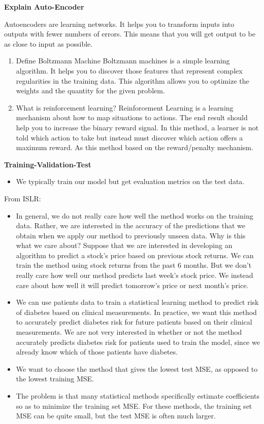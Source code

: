\documentclass[
]{book}
\providecommand{\tightlist}{%
  \setlength{\itemsep}{0pt}\setlength{\parskip}{0pt}}
\begin{document}
\textbf{Explain Auto-Encoder}

Autoencoders are learning networks. It helps you to transform inputs into outputs with fewer numbers of errors. This means that you will get output to be as close to input as possible.

\begin{enumerate}
\def\labelenumi{\arabic{enumi}.}
\setcounter{enumi}{35}
\item
  Define Boltzmann Machine
  Boltzmann machines is a simple learning algorithm. It helps you to discover those features that represent complex regularities in the training data. This algorithm allows you to optimize the weights and the quantity for the given problem.
\item
  What is reinforcement learning?
  Reinforcement Learning is a learning mechanism about how to map situations to actions. The end result should help you to increase the binary reward signal. In this method, a learner is not told which action to take but instead must discover which action offers a maximum reward. As this method based on the reward/penalty mechanism.
\end{enumerate}

\textbf{Training-Validation-Test}

\begin{itemize}
\tightlist
\item
  We typically train our model but get evaluation metrics on the test data.
\end{itemize}

From ISLR:

\begin{itemize}
\item
  In general, we do not really care how well the method works on the training data. Rather, we are interested in the accuracy of the predictions that we obtain when we apply our method to previously unseen data. Why is this what we care about? Suppose that we are interested in developing an algorithm to predict a stock's price based on previous stock returns. We can train the method using stock returns from the past 6 months. But we don't really care how well our method predicts last week's stock price. We instead care about how well it will predict tomorrow's price or next month's price.
\item
  We can use patients data to train a statistical learning method to predict risk of diabetes based on clinical measurements. In practice, we want this method to accurately predict diabetes risk for future patients based on their clinical measurements. We are not very interested in whether or not the method accurately predicts diabetes risk for patients used to train the model, since we already know which of those patients have diabetes.
\item
  We want to choose the method that gives the lowest test MSE, as opposed to the lowest training MSE.
\item
  The problem is that many statistical methods specifically estimate coefficients so as to minimize the training set MSE. For these methods, the training set MSE can be quite small, but the test MSE is often much larger.
\end{itemize}
\end{document}
